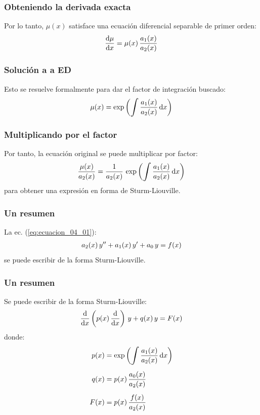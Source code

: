 \documentclass[12pt]{beamer}
\begin{document}
\begin{frame}
\frametitle{Obteniendo la derivada exacta}
Por lo tanto, $\mu (x)$ satisface una ecuación diferencial separable de primer orden:
\pause
\begin{align*}
\dv{\mu}{x} = \mu (x) \, \dfrac{a_{1} (x)}{a_{2} (x)}
\end{align*}
\end{frame}
\begin{frame}
\frametitle{Solución a a ED}
Esto se resuelve formalmente para dar el factor de integración buscado:
\pause
\begin{align*}
\mu (x) = \exp \left( \scaleint{6ex} \, \dfrac{a_{1}(x)}{a_{2}(x)} \dd{x} \right)
\end{align*}
\end{frame}
\begin{frame}
\frametitle{Multiplicando por el factor}
Por tanto, la ecuación original se puede multiplicar por factor:
\pause
\begin{align*}
\dfrac{\mu (x)}{a_{2} (x)} = \dfrac{1}{a_{2} (x)} \, \exp \left( \scaleint{6ex} \, \dfrac{a_{1} (x)}{a_{2} (x)} \dd{x} \right)
\end{align*}
para obtener una expresión en forma de Sturm-Liouville.
\end{frame}
\begin{frame}
\frametitle{Un resumen}
La ec. (\ref{eq:ecuacion_04_01}):
\begin{align*}
a_{2} (x) \, {y}^{\prime \prime} + a_{1} (x) \, {y}^{\prime} + a_{0} \, y = f(x)
\end{align*}
se puede escribir de la forma Sturm-Liouville.
\end{frame}
\begin{frame}
\frametitle{Un resumen}
Se puede escribir de la forma Sturm-Liouville:
\pause
\begin{align}
\dv{x} \left( p(x) \, \dv{x} \right) \, y + q(x) \, y =  F(x)
\label{eq:ecuacion_04_08}
\end{align}
\pause
donde:
\begin{align}
\begin{aligned}
p(x) &= \exp \left( \scaleint{6ex} \, \dfrac{a_{1}(x)}{a_{2}(x)} \dd{x} \right) \\[0.5em]
q(x) &= p(x) \, \dfrac{a_{0}(x)}{a_{2}(x)} \\[0.5em]
F(x) &= p(x) \, \dfrac{f(x)}{a_{2}(x)}
\end{aligned}
\label{eq:ecuacion_04_09}
\end{align}
\end{frame}
\end{document}

